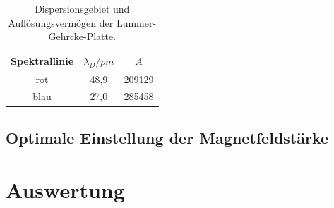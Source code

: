 \FloatBarrier
\begin{table}
    \centering
    \caption{Dispersionsgebiet und Auflösungsvermögen der Lummer-Gehrcke-Platte.}
    \label{tab:v1}
    \begin{tabular}{c S[table-format=2.1] S[table-format=6.0] }
      \toprule
       {Spektrallinie} & {$\lambda_{\si{D}}/\si{pm}$}& {$A$}\\
      \midrule
      \midrule
        rot & 48,9 & 209129 \\
        blau & 27,0 & 285458 \\
      \bottomrule
    \end{tabular}
\end{table}
\FloatBarrier


\subsection{Optimale Einstellung der Magnetfeldstärke}




\section{Auswertung}
\label{sec:Auswertung}






